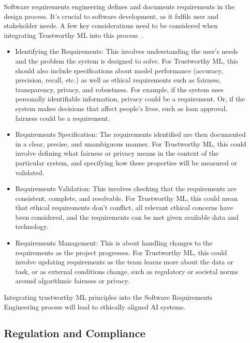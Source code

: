 \documentclass[a4paper,11pt]{article}
\begin{document}
Software requirements engineering defines and documents requirements in the design process. It's crucial to software development, as it fulfils user and stakeholder needs. A few key considerations need to be considered when integrating Trustworthy ML into this process~\cite{serban2021practices}.
\begin{itemize}
\item Identifying the Requirements: This involves understanding the user's needs and the problem the system is designed to solve. For Trustworthy ML, this should also include specifications about model performance (accuracy, precision, recall, etc.) as well as ethical requirements such as fairness, transparency, privacy, and robustness. For example, if the system uses personally identifiable information, privacy could be a requirement. Or, if the system makes decisions that affect people's lives, such as loan approval, fairness could be a requirement.

\item Requirements Specification: The requirements identified are then documented in a clear, precise, and unambiguous manner. For Trustworthy ML, this could involve defining what fairness or privacy means in the context of the particular system, and specifying how these properties will be measured or validated.

\item Requirements Validation: This involves checking that the requirements are consistent, complete, and resolvable. For Trustworthy ML, this could mean that ethical requirements don't conflict, all relevant ethical concerns have been considered, and the requirements can be met given available data and technology.

\item Requirements Management: This is about handling changes to the requirements as the project progresses. For Trustworthy ML, this could involve updating requirements as the team learns more about the data or task, or as external conditions change, such as regulatory or societal norms around algorithmic fairness or privacy.
\end{itemize}
Integrating trustworthy ML principles into the Software Requirements Engineering process will lead to ethically aligned AI systems.

\subsection{Regulation and Compliance}
\end{document}
